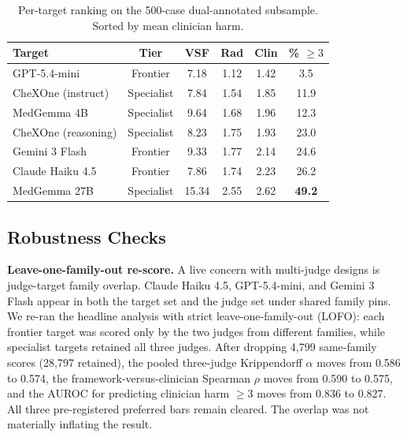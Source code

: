 \documentclass[conference]{IEEEtran}
\begin{document}
\begin{table}[t]
\caption{Per-target ranking on the 500-case dual-annotated subsample. Sorted by mean clinician harm.}
\label{tab:per_target_clinician}
\begin{center}
\renewcommand{\arraystretch}{1.15}
\setlength{\tabcolsep}{3pt}
\begin{tabular}{lccccc}
\toprule
\textbf{Target} & \textbf{Tier} & \textbf{VSF} & \textbf{Rad} & \textbf{Clin} & \textbf{\% $\ge 3$} \\
\midrule
GPT-5.4-mini         & Frontier   &  7.18 & 1.12 & 1.42 &  3.5 \\
CheXOne (instruct)   & Specialist &  7.84 & 1.54 & 1.85 & 11.9 \\
MedGemma 4B          & Specialist &  9.64 & 1.68 & 1.96 & 12.3 \\
CheXOne (reasoning)  & Specialist &  8.23 & 1.75 & 1.93 & 23.0 \\
Gemini 3 Flash       & Frontier   &  9.33 & 1.77 & 2.14 & 24.6 \\
Claude Haiku 4.5     & Frontier   &  7.86 & 1.74 & 2.23 & 26.2 \\
MedGemma 27B         & Specialist & 15.34 & 2.55 & 2.62 & \textbf{49.2} \\
\bottomrule
\end{tabular}
\end{center}
\end{table}

\subsection{Robustness Checks}\label{sec:robustness}

\textbf{Leave-one-family-out re-score.} A live concern with multi-judge designs is judge-target family overlap. Claude Haiku 4.5, GPT-5.4-mini, and Gemini 3 Flash appear in both the target set and the judge set under shared family pins. We re-ran the headline analysis with strict leave-one-family-out (LOFO): each frontier target was scored only by the two judges from different families, while specialist targets retained all three judges. After dropping 4{,}799 same-family scores (28{,}797 retained), the pooled three-judge Krippendorff $\alpha$ moves from 0.586 to 0.574, the framework-versus-clinician Spearman $\rho$ moves from 0.590 to 0.575, and the AUROC for predicting clinician harm $\ge 3$ moves from 0.836 to 0.827. All three pre-registered preferred bars remain cleared. The overlap was not materially inflating the result.
\end{document}
